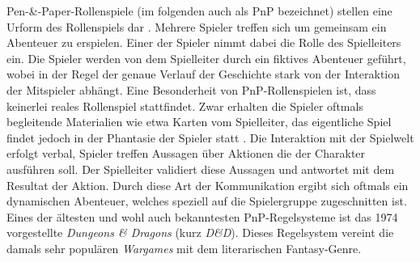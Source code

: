 Pen-\&-Paper-Rollenspiele (im folgenden auch als PnP bezeichnet) stellen eine Urform des Rollenspiels dar \cite{Apperley2006}. Mehrere Spieler treffen sich um gemeinsam ein Abenteuer zu erspielen. Einer der Spieler nimmt dabei die Rolle des Spielleiters ein. Die Spieler werden von dem Spielleiter durch ein fiktives Abenteuer geführt, wobei in der Regel der genaue Verlauf der Geschichte stark von der Interaktion der Mitspieler abhängt. \cite{Apperley2006}\newline 
Eine Besonderheit von PnP-Rollenspielen ist, dass keinerlei reales Rollenspiel stattfindet. Zwar erhalten die Spieler oftmals begleitende Materialien wie etwa Karten vom Spielleiter, das eigentliche Spiel findet jedoch in der Phantasie der Spieler statt \cite{Copier2005}. Die Interaktion mit der Spielwelt erfolgt verbal, Spieler treffen Aussagen über Aktionen die der Charakter ausführen soll. Der Spielleiter validiert diese Aussagen und antwortet mit dem Resultat der Aktion. Durch diese Art der Kommunikation ergibt sich oftmals ein dynamischen Abenteuer, welches speziell auf die Spielergruppe zugeschnitten ist. \cite{Drachen2008}\newline
Eines der ältesten und wohl auch bekanntesten PnP-Regelsysteme ist das 1974 vorgestellte \emph{Dungeons \& Dragons} (kurz \emph{D\&D}). Dieses Regelsystem vereint die damals sehr populären \emph{Wargames} mit dem literarischen Fantasy-Genre. \cite{Copier2005}


